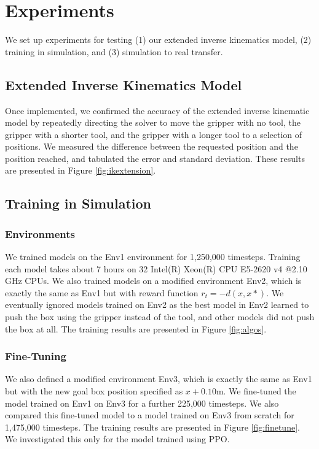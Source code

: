 \documentclass[conference]{IEEEtran}
\begin{document}
\section{Experiments}

We set up experiments for testing (1) our extended inverse kinematics model, (2) training in simulation, and (3) simulation to real transfer.

\subsection{Extended Inverse Kinematics Model}
Once implemented, we confirmed the accuracy of the extended inverse kinematic model by repeatedly directing the solver to move the gripper with no tool, the gripper with a shorter tool, and the gripper with a longer tool to a selection of positions. We measured the difference between the requested position and the position reached, and tabulated the error and standard deviation. These results are presented in Figure \ref{fig:ikextension}. 

\subsection{Training in Simulation}

\vspace{2mm}
\subsubsection{Environments}
We trained models on the Env1 environment for 1,250,000 timesteps. Training each model takes about 7 hours on 32 Intel(R) Xeon(R) CPU E5-2620 v4 @2.10 GHz CPUs. We also trained models on a modified environment Env2, which is exactly the same as Env1 but with reward function $r_t = -d(x,x*)$. We eventually ignored models trained on Env2 as the best model in Env2 learned to push the box using the gripper instead of the tool, and other models did not push the box at all. The training results are presented in Figure \ref{fig:algos}.

\vspace{2mm}
\subsubsection{Fine-Tuning}
We also defined a modified environment Env3, which is exactly the same as Env1 but with the new goal box position specified as $x + 0.10$m. We fine-tuned the model trained on Env1 on Env3 for a further 225,000 timesteps. We also compared this fine-tuned model to a model trained on Env3 from scratch for 1,475,000 timesteps. The training results are presented in Figure \ref{fig:finetune}. We investigated this only for the model trained using PPO.
\end{document}
